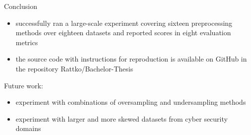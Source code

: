 \documentclass[a0paper, portrait, fontscale=0.255]{baposter}
\begin{document}
\begin{poster}
\begin{posterbox}[
    column=1, name=conclusion, below=result-main, bottomaligned=result-ranks
]{Conclusion}
    \begin{itemize}[leftmargin=1.2em]
        \item successfully ran a large-scale experiment covering sixteen preprocessing methods over
            eighteen datasets and reported scores in eight evaluation metrics
        \item the source code with instructions for reproduction is available on GitHub in the
            repository Rattko/Bachelor-Thesis
    \end{itemize}

    Future work:
    \begin{itemize}[leftmargin=1.2em]
        \item experiment with combinations of oversampling and undersampling methods
        \item experiment with larger and more skewed datasets from cyber security domains
    \end{itemize}
\end{posterbox}

\end{poster}
\end{document}

